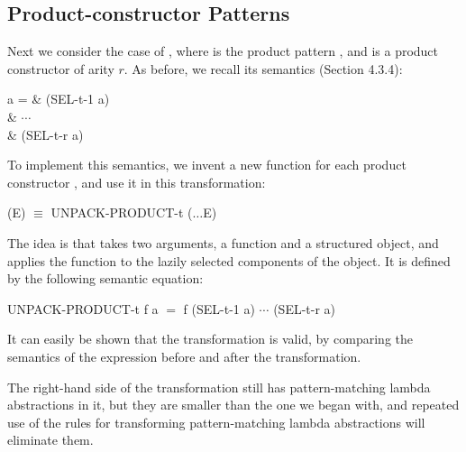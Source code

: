 \subsection{Product-constructor Patterns}

Next we consider the case of , where  is the product pattern
, and  is a product constructor of arity $r$. As before, we recall its
semantics (Section 4.3.4):
\begin{letalign}
	 a =  & (SEL-t-1 a)\\
	& $\cdots$\\
	& (SEL-t-r a)
\end{letalign}

To implement this semantics, we invent a new function
 for each product constructor , and use it in this
transformation:
\begin{mlcoded}
(E) $\equiv$ UNPACK-PRODUCT-t ($\ldots$E)
\end{mlcoded}
The idea is that  takes two arguments, a function and a
structured object, and applies the function to the lazily selected components
of the object. It is defined by the following semantic equation:
\begin{mlcoded}
UNPACK-PRODUCT-t f a $=$ f (SEL-t-1 a) $\cdots$ (SEL-t-r a)
\end{mlcoded}
It can easily be shown that the transformation is valid, by comparing the
semantics of the expression before and after the transformation.

The right-hand side of the transformation still has pattern-matching lambda
abstractions in it, but they are smaller than the one we began with, and
repeated use of the rules for transforming pattern-matching lambda
abstractions will eliminate them.

